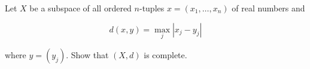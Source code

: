 Let $X$ be a subspace of all ordered $n$-tuples $x=(x_1,\ldots,x_n)$ of real numbers and

$$d(x,y)=\max_j|x_j-y_j|$$

where $y=(y_j)$. Show that $(X,d)$ is complete.\\